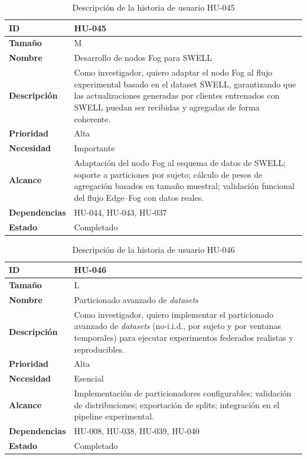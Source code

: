 \documentclass{report}
\begin{document}
\begin{table}[H]
\centering
\caption{Descripción de la historia de usuario HU-045}
\label{tab:hu045}
\begin{tabular}{|l|p{12cm}|}
\hline
\textbf{ID} & HU-045 \\ \hline
\textbf{Tamaño} & M \\ \hline
\textbf{Nombre} & Desarrollo de nodos Fog para SWELL \\ \hline
\textbf{Descripción} &
Como investigador, quiero adaptar el nodo Fog al flujo experimental basado en el dataset SWELL, garantizando que las actualizaciones generadas por clientes entrenados con SWELL puedan ser recibidas y agregadas de forma coherente. \\ \hline
\textbf{Prioridad} & Alta \\ \hline
\textbf{Necesidad} & Importante \\ \hline
\textbf{Alcance} &
Adaptación del nodo Fog al esquema de datos de SWELL; soporte a particiones por sujeto; cálculo de pesos de agregación basados en tamaño muestral; validación funcional del flujo Edge--Fog con datos reales. \\ \hline
\textbf{Dependencias} & HU-044, HU-043, HU-037 \\ \hline
\textbf{Estado} & Completado \\ \hline
\end{tabular}
\end{table}



\begin{table}[H]
\centering
\caption{Descripción de la historia de usuario HU-046}
\label{tab:hu046}
\begin{tabular}{|l|p{12cm}|}
\hline
\textbf{ID} & HU-046 \\ \hline
\textbf{Tamaño} & L \\ \hline
\textbf{Nombre} & Particionado avanzado de \textit{datasets} \\ \hline
\textbf{Descripción} &
Como investigador, quiero implementar el particionado avanzado de \textit{datasets} (no-i.i.d., por sujeto y por ventanas temporales) para ejecutar experimentos federados realistas y reproducibles. \\ \hline
\textbf{Prioridad} & Alta \\ \hline
\textbf{Necesidad} & Esencial \\ \hline
\textbf{Alcance} &
Implementación de particionadores configurables; validación de distribuciones; exportación de splits; integración en el pipeline experimental. \\ \hline
\textbf{Dependencias} & HU-008, HU-038, HU-039, HU-040 \\ \hline
\textbf{Estado} & Completado \\ \hline
\end{tabular}
\end{table}
\end{document}

